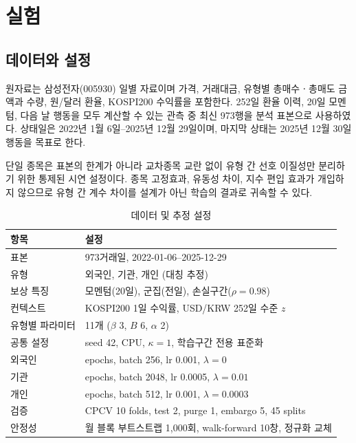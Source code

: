\section{실험}
\label{sec:experiments}

\subsection{데이터와 설정}
\label{sec:data}

원자료는 삼성전자(005930) 일별 자료이며 가격, 거래대금, 유형별 총매수ㆍ총매도
금액과 수량, 원/달러 환율, KOSPI200 수익률을 포함한다. 252일 환율 이력, 20일
모멘텀, 다음 날 행동을 모두 계산할 수 있는 관측 중 최신 973행을 분석 표본으로
사용하였다. 상태일은 2022년 1월 6일--2025년 12월 29일이며, 마지막 상태는
2025년 12월 30일 행동을 목표로 한다.

단일 종목은 표본의 한계가 아니라 교차종목 교란 없이 유형 간 선호 이질성만
분리하기 위한 통제된 시연 설정이다. 종목 고정효과, 유동성 차이, 지수 편입 효과가
개입하지 않으므로 유형 간 계수 차이를 설계가 아닌 학습의 결과로 귀속할 수 있다.

\begin{table}[t]
  \caption{데이터 및 추정 설정}
  \label{tab:setup}
  \small
  \begin{tabular}{@{}>{\raggedright\arraybackslash}p{}
                  >{\raggedright\arraybackslash}p{}@{}}
    \toprule
    항목 & 설정 \\
    \midrule
    표본 & 973거래일, 2022-01-06--2025-12-29 \\
    유형 & 외국인, 기관, 개인 (대칭 추정) \\
    보상 특징 & 모멘텀(20일), 군집(전일), 손실구간($\rho=0.98$) \\
    컨텍스트 & KOSPI200 1일 수익률, USD/KRW 252일 수준 $z$ \\
    유형별 파라미터 & 11개 ($\beta$ 3, $B$ 6, $\alpha$ 2) \\
    공통 설정 & seed 42, CPU, $\kappa=1$, 학습구간 전용 표준화 \\
    외국인 & 75 epochs, batch 256, lr 0.001, $\lambda=0$ \\
    기관 & 10 epochs, batch 2048, lr 0.0005, $\lambda=0.01$ \\
    개인 & 20 epochs, batch 512, lr 0.001, $\lambda=0.0003$ \\
    검증 & CPCV 10 folds, test 2, purge 1, embargo 5, 45 splits \\
    안정성 & 월 블록 부트스트랩 1{,}000회, walk-forward 10창, 정규화 교체 \\
    \bottomrule
  \end{tabular}
\end{table}

